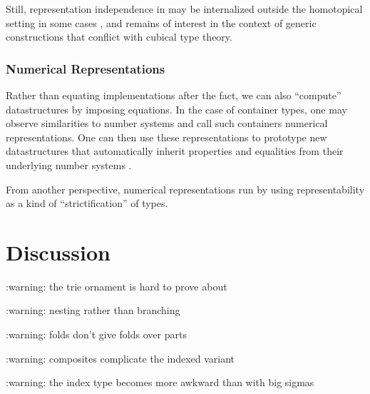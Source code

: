 \documentclass[10pt]{article}
\theoremstyle{plain}
\theoremstyle{definition}
\begin{document}
Still, representation independence in may be internalized outside the homotopical setting in some cases \cite{tgalois}, and remains of interest in the context of generic constructions that conflict with cubical type theory.

\section{Numerical Representations}
Rather than equating implementations after the fact, we can also ``compute'' datastructures by imposing equations. In the case of container types, one may observe similarities to number systems \cite{purelyfunctional} and call such containers numerical representations. One can then use these representations to prototype new datastructures that automatically inherit properties and equalities from their underlying number systems \cite{calcdata}.

From another perspective, numerical representations run by using representability as a kind of ``strictification'' of types. %

\part{Discussion}
\begin{outline}
:warning: the trie ornament is hard to prove about

:warning: nesting rather than branching

:warning: folds don't give folds over parts

:warning: composites complicate the indexed variant

:warning: the index type becomes more awkward than with big sigmas
\end{outline}
\end{document}
